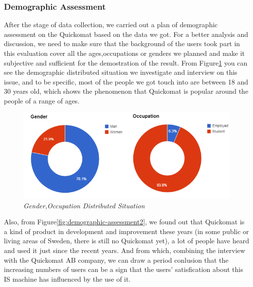 \documentclass[twocolumn]{article}
\begin{document}
\subsubsection{Demographic Assessment}
After the stage of data collection, we carried out a plan of demographic assessment on the Quickomat based on the data we got. For a better analysis and discussion, we need to make sure that the background of the users took part in this evaluation cover all the ages,occupations or genders we planned and make it subjective and sufficient for the demostration of the result. From Figure\ref{fig:demographic-assessment} you can see the demographic distributed situation we investigate and interview on this issue, and to be specific, most of the people we got touch into are between 18 and 30 years old, which shows the phenomenon that Quickomat is popular around the people of a range of ages.
\begin{figure}
  \centering
  \includegraphics[width=\columnwidth]{fig/demographic-assessment.png}
  \caption{\emph{Gender,Occupation Distributed Situation}}
  \label{fig:demographic-assessment}
\end{figure}

Also, from Figure\ref{fig:demographic-assessment2}, we found out that Quickomat is a kind of product in development and improvement these years (in some public or living areas of Sweden, there is still no Quickomat yet), a lot of people have heard and used it just since the recent years. And from which, combining the interview with the Quickomat AB company, we can draw a period conlusion that the increasing numbers of users can be a sign that the users' satisfication about this IS machine has influenced by the use of it. 
\end{document}
